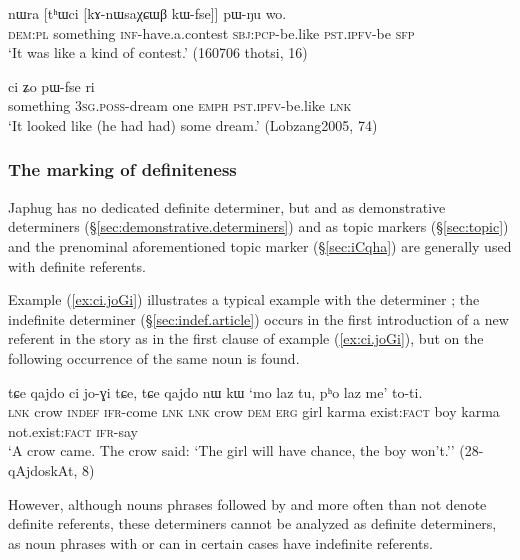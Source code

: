  \begin{exe}
\ex \label{ex:thWci.kAnWsaXCWB}
\gll nɯra [tʰɯci [kɤ-nɯsaχɕɯβ kɯ-fse]] pɯ-ŋu wo.  \\
\textsc{dem}:\textsc{pl} something \textsc{inf}-have.a.contest \textsc{sbj}:\textsc{pcp}-be.like \textsc{pst}.\textsc{ipfv}-be \textsc{sfp} \\
\glt `It was like a kind of contest.' (160706 thotsi, 16)
 \end{exe}
 
\begin{exe}
\ex \label{ex:thWci.WjmNo}
 ci ʑo pɯ-fse ri \\
something \textsc{3sg}.\textsc{poss}-dream one \textsc{emph} \textsc{pst}.\textsc{ipfv}-be.like \textsc{lnk} \\
\glt `It looked like (he had had) some dream.' (Lobzang2005, 74)
 \end{exe}
 
 
\subsubsection{The marking of definiteness} \label{sec:definiteness}
Japhug has no dedicated definite determiner, but   and   as demonstrative determiners (§\ref{sec:demonstrative.determiners}) and as topic markers (§\ref{sec:topic}) and the prenominal aforementioned topic marker  (§\ref{sec:iCqha}) are generally used with definite referents.  

Example (\ref{ex:ci.joGi}) illustrates a typical example with the determiner ; the indefinite determiner  (§\ref{sec:indef.article}) occurs in the first introduction of a new referent in the story as in the first clause of example (\ref{ex:ci.joGi}), but on the following occurrence of the same noun  is found.

\begin{exe}
\ex \label{ex:ci.joGi}
 \gll  tɕe qajdo ci jo-ɣi tɕe, tɕe qajdo nɯ kɯ `mo laz tu, pʰo laz me' to-ti. \\
 \textsc{lnk} crow \textsc{indef} \textsc{ifr}-come \textsc{lnk} \textsc{lnk} crow \textsc{dem} \textsc{erg} girl karma exist:\textsc{fact} boy karma not.exist:\textsc{fact} \textsc{ifr}-say \\
 \glt `A crow came. The crow said: `The girl will have chance, the boy won't.'' (28-qAjdoskAt, 8)
\end{exe}

However, although nouns phrases followed by  and  more often than not denote definite referents, these determiners cannot be analyzed as definite determiners, as noun phrases with  or  can in certain cases have indefinite referents. 

